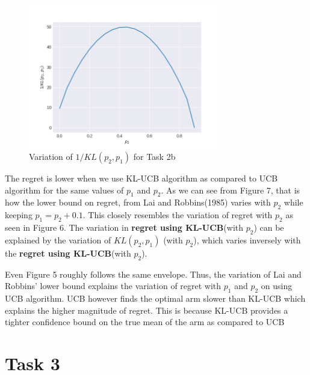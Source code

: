 \documentclass[11pt]{article}
\begin{document}
 \begin{figure}[H]
    \begin{center}
        \includegraphics[width=0.75\textwidth]{../images/task2b_support.png}
        
        \caption{Variation of $1/KL(p_2,p_1)$ for Task 2b}
    \end{center}
 \end{figure}

The regret is lower when we use KL-UCB algorithm as compared to UCB algorithm
for the same values of $p_1$ and $p_2$. As we can see from Figure 7, that is how 
the lower bound on regret, from Lai and Robbins(1985) varies with $p_2$ while
keeping $p_1 = p_2 + 0.1$. This closely resembles the variation of regret with
$p_2$ as seen in Figure 6. The variation in \textbf{regret using KL-UCB}(with $p_2$)
can be explained by the variation of $KL(p_2,p_1)$ (with $p_2$), which varies inversely 
with the \textbf{regret using KL-UCB}(with $p_2$). 

\noindent
Even Figure 5 roughly follows the same envelope. Thus, the variation of Lai and Robbins' lower 
bound explains the variation of regret with $p_1$ and $p_2$ on using UCB algorithm. 
UCB however finds the optimal arm slower than KL-UCB which explains the higher 
magnitude of regret. This is because KL-UCB provides a tighter confidence bound 
on the true mean of the arm as compared to UCB

\section*{Task 3}
\end{document}
